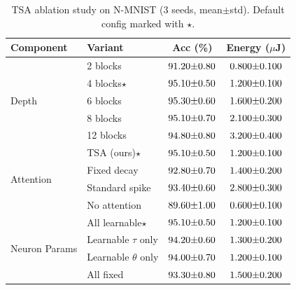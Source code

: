 
\begin{table}[t]
\centering
\caption{
    TSA ablation study on N-MNIST (3 seeds, mean$\pm$std).
    Default config marked with $\star$.
}
\label{tab:ablation}
\begin{tabular}{llcc}
\toprule
\textbf{Component} & \textbf{Variant} & \textbf{Acc (\%)} & \textbf{Energy ($\mu$J)} \\
\midrule
\multirow{5}{*}{Depth} & 2 blocks & $91.20{\scriptsize\pm0.80}$ & $0.800{\scriptsize\pm0.100}$ \\
 & 4 blocks$\star$ & \textbf{$95.10{\scriptsize\pm0.50}$} & $1.200{\scriptsize\pm0.100}$ \\
 & 6 blocks & $95.30{\scriptsize\pm0.60}$ & $1.600{\scriptsize\pm0.200}$ \\
 & 8 blocks & $95.10{\scriptsize\pm0.70}$ & $2.100{\scriptsize\pm0.300}$ \\
 & 12 blocks & $94.80{\scriptsize\pm0.80}$ & $3.200{\scriptsize\pm0.400}$ \\
\midrule
\multirow{4}{*}{Attention} & TSA (ours)$\star$ & \textbf{$95.10{\scriptsize\pm0.50}$} & $1.200{\scriptsize\pm0.100}$ \\
 & Fixed decay & $92.80{\scriptsize\pm0.70}$ & $1.400{\scriptsize\pm0.200}$ \\
 & Standard spike & $93.40{\scriptsize\pm0.60}$ & $2.800{\scriptsize\pm0.300}$ \\
 & No attention & $89.60{\scriptsize\pm1.00}$ & $0.600{\scriptsize\pm0.100}$ \\
\midrule
\multirow{4}{*}{Neuron Params} & All learnable$\star$ & \textbf{$95.10{\scriptsize\pm0.50}$} & $1.200{\scriptsize\pm0.100}$ \\
 & Learnable $\tau$ only & $94.20{\scriptsize\pm0.60}$ & $1.300{\scriptsize\pm0.200}$ \\
 & Learnable $\theta$ only & $94.00{\scriptsize\pm0.70}$ & $1.200{\scriptsize\pm0.100}$ \\
 & All fixed & $93.30{\scriptsize\pm0.80}$ & $1.500{\scriptsize\pm0.200}$ \\
\bottomrule
\end{tabular}
\end{table}